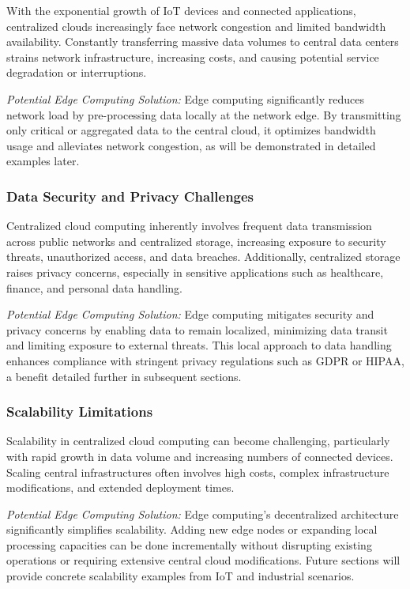 \documentclass[runningheads]{llncs}
\begin{document}
With the exponential growth of IoT devices and connected applications, centralized clouds increasingly face network congestion and limited bandwidth availability. Constantly transferring massive data volumes to central data centers strains network infrastructure, increasing costs, and causing potential service degradation or interruptions.




\textit{Potential Edge Computing Solution:} Edge computing significantly reduces network load by pre-processing data locally at the network edge. By transmitting only critical or aggregated data to the central cloud, it optimizes bandwidth usage and alleviates network congestion, as will be demonstrated in detailed examples later.

\subsubsection{Data Security and Privacy Challenges}
Centralized cloud computing inherently involves frequent data transmission across public networks and centralized storage, increasing exposure to security threats, unauthorized access, and data breaches. Additionally, centralized storage raises privacy concerns, especially in sensitive applications such as healthcare, finance, and personal data handling.

\textit{Potential Edge Computing Solution:} Edge computing mitigates security and privacy concerns by enabling data to remain localized, minimizing data transit and limiting exposure to external threats. This local approach to data handling enhances compliance with stringent privacy regulations such as GDPR or HIPAA, a benefit detailed further in subsequent sections.

\subsubsection{Scalability Limitations}
Scalability in centralized cloud computing can become challenging, particularly with rapid growth in data volume and increasing numbers of connected devices. Scaling central infrastructures often involves high costs, complex infrastructure modifications, and extended deployment times.

\textit{Potential Edge Computing Solution:} Edge computing's decentralized architecture significantly simplifies scalability. Adding new edge nodes or expanding local processing capacities can be done incrementally without disrupting existing operations or requiring extensive central cloud modifications. Future sections will provide concrete scalability examples from IoT and industrial scenarios.
\end{document}
